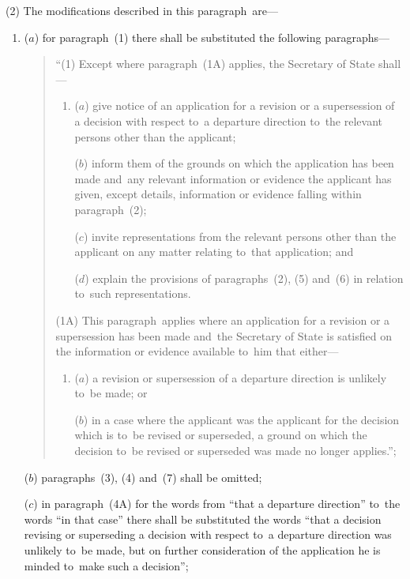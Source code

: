 \documentclass[12pt,a4paper]{article}
\begin{document}
(2) The modifications described in this paragraph~are---
\begin{enumerate}\item[]
\begin{sloppypar}
($a$) for paragraph~(1) there shall be substituted the following para\-graphs---
\end{sloppypar}
\begin{quotation}
“(1) Except where paragraph~(1A) applies, the Secretary of State shall---
\begin{enumerate}\item[]
($a$) give notice of an application for a revision or a supersession of a decision with respect to~a departure direction to~the relevant persons other than the applicant;

($b$) inform them of the grounds on which the application has been made and~any relevant information or evidence the applicant has given, except details, information or evidence falling within paragraph~(2);

($c$) invite representations from the relevant persons other than the applicant on any matter relating to~that application; and

($d$) explain the provisions of paragraphs~(2), (5) and~(6) in relation to~such representations.
\end{enumerate}

(1A) This paragraph~applies where an application for a revision or a supersession has been made and~the Secretary of State is satisfied on the information or evidence available to~him that either---
\begin{enumerate}\item[]
($a$) a revision or supersession of a departure direction is unlikely to~be made; or

($b$) in a case where the applicant was the applicant for the decision which is to~be revised or superseded, a ground on which the decision to~be revised or superseded was made no longer applies.”;
\end{enumerate}
\end{quotation}

($b$) paragraphs~(3), (4) and~(7) shall be omitted;

($c$) in paragraph~(4A) for the words from “that a departure direction” to~the words “in that case” there shall be substituted the words “that a decision revising or superseding a decision with respect to~a departure direction was unlikely to~be made, but on further consideration of the application he is minded to~make such a decision”;


\end{enumerate}
\end{document}
